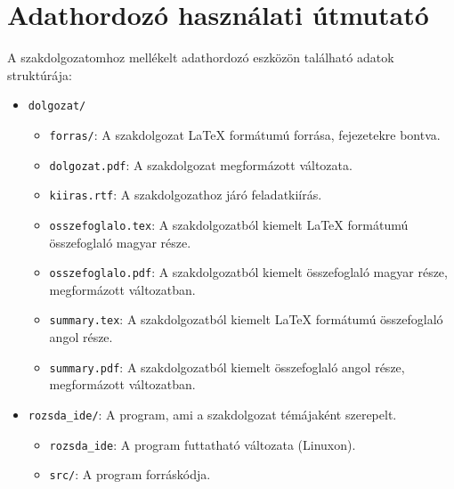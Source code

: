 \chapter*{Adathordozó használati útmutató}



\noindent A szakdolgozatomhoz mellékelt adathordozó eszközön található adatok struktúrája:

\begin{itemize}
    \item \texttt{dolgozat/}
    \begin{itemize}
        \item \texttt{forras/}: A szakdolgozat \LaTeX{} formátumú forrása, fejezetekre bontva.
        \item \texttt{dolgozat.pdf}: A szakdolgozat megformázott változata.
        \item \texttt{kiiras.rtf}: A szakdolgozathoz járó feladatkiírás.
        \item \texttt{osszefoglalo.tex}: A szakdolgozatból kiemelt \LaTeX{} formátumú összefoglaló magyar része.
        \item \texttt{osszefoglalo.pdf}: A szakdolgozatból kiemelt összefoglaló magyar része, megformázott változatban.
        \item \texttt{summary.tex}: A szakdolgozatból kiemelt \LaTeX{} formátumú összefoglaló angol része.
        \item \texttt{summary.pdf}: A szakdolgozatból kiemelt összefoglaló angol része, megformázott változatban.
    \end{itemize}
    \item \texttt{rozsda\_ide/}: A program, ami a szakdolgozat témájaként szerepelt.
    \begin{itemize}
        \item \texttt{rozsda\_ide}: A program futtatható változata (Linuxon).
        \item \texttt{src/}: A program forráskódja.
    \end{itemize}
\end{itemize}
